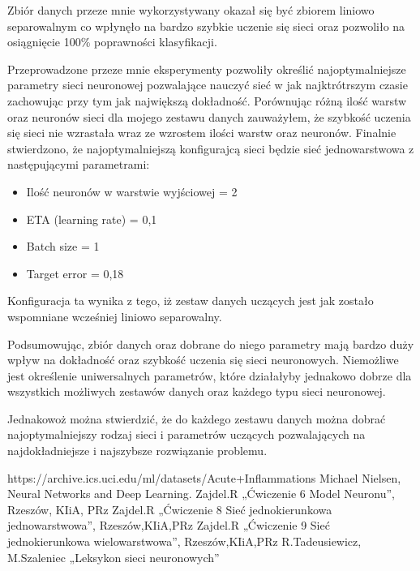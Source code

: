 \documentclass[12pt,twoside]{article}
\begin{document}
Zbiór danych przeze mnie wykorzystywany okazał się być zbiorem liniowo separowalnym co wpłynęło na bardzo szybkie uczenie się sieci oraz pozwoliło na osiągnięcie 100\% poprawności klasyfikacji.

Przeprowadzone przeze mnie eksperymenty pozwoliły określić najoptymalniejsze parametry sieci neuronowej pozwalające nauczyć sieć w jak najktrótrszym czasie zachowując przy tym jak największą dokładność. Porównując różną ilość warstw oraz neuronów sieci dla mojego zestawu danych zauważyłem, że szybkość uczenia się sieci nie wzrastała wraz ze wzrostem ilości warstw oraz neuronów. Finalnie stwierdzono, że najoptymalniejszą konfigurajcą sieci będzie sieć jednowarstwowa z następującymi parametrami:
\begin{itemize}
	\item Ilość neuronów w warstwie wyjściowej = 2
	\item ETA (learning rate) = 0,1
	\item Batch size = 1
	\item Target error = 0,18
\end{itemize}
Konfiguracja ta wynika z tego, iż zestaw danych uczących jest jak zostało wspomniane wcześniej liniowo separowalny.

Podsumowując, zbiór danych oraz dobrane do niego parametry mają bardzo duży wpływ na dokładność oraz szybkość uczenia się sieci neuronowych. Niemożliwe jest określenie uniwersalnych parametrów, które działałyby jednakowo dobrze dla wszystkich możliwych zestawów danych oraz każdego typu sieci neuronowej.

Jednakowoż można stwierdzić, że do każdego zestawu danych można dobrać najoptymalniejszy rodzaj sieci i parametrów uczących pozwalających na najdokładniejsze i najszybsze rozwiązanie problemu. 
\clearpage


\begin{thebibliography}{4}
 https://archive.ics.uci.edu/ml/datasets/Acute+Inflammations
 Michael Nielsen, Neural Networks and Deep Learning.
 Zajdel.R „Ćwiczenie 6 Model Neuronu”, Rzeszów, KIiA, PRz
 Zajdel.R „Ćwiczenie 8 Sieć jednokierunkowa jednowarstwowa”, Rzeszów,KIiA,PRz
 Zajdel.R „Ćwiczenie 9 Sieć jednokierunkowa wielowarstwowa”, Rzeszów,KIiA,PRz
 R.Tadeusiewicz, M.Szaleniec „Leksykon sieci neuronowych”
\end{thebibliography}

\clearpage
\end{document}
